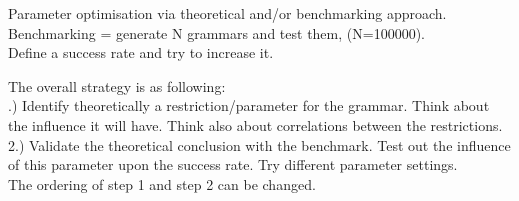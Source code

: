 \noindent Parameter optimisation via theoretical and/or benchmarking approach. \\ Benchmarking = generate N grammars and test them, (N=100000). \\
Define a success rate and try to increase it. \\

\pagebreak

\noindent The overall strategy is as following: \\

.) Identify theoretically a restriction/parameter for the grammar. Think about the influence it will have. Think also about correlations between the restrictions.\\
2.) Validate the theoretical conclusion with the benchmark. Test out the influence of this parameter upon the success rate. Try different parameter settings. \\

\noindent The ordering of step 1 and step 2 can be changed.\\

\pagebreak